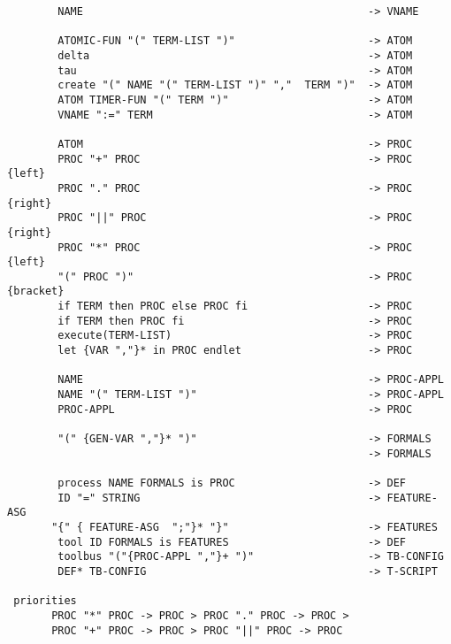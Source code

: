 \begin{verbatim}
        NAME                                             -> VNAME

        ATOMIC-FUN "(" TERM-LIST ")"                     -> ATOM
        delta                                            -> ATOM
        tau                                              -> ATOM
        create "(" NAME "(" TERM-LIST ")" ","  TERM ")"  -> ATOM
        ATOM TIMER-FUN "(" TERM ")"                      -> ATOM
        VNAME ":=" TERM                                  -> ATOM

        ATOM                                             -> PROC
        PROC "+" PROC                                    -> PROC  {left}
        PROC "." PROC                                    -> PROC  {right}
        PROC "||" PROC                                   -> PROC  {right}
        PROC "*" PROC                                    -> PROC  {left}
        "(" PROC ")"                                     -> PROC  {bracket}
        if TERM then PROC else PROC fi                   -> PROC
        if TERM then PROC fi                             -> PROC
        execute(TERM-LIST)                               -> PROC
        let {VAR ","}* in PROC endlet                    -> PROC

        NAME                                             -> PROC-APPL
        NAME "(" TERM-LIST ")"                           -> PROC-APPL
        PROC-APPL                                        -> PROC

        "(" {GEN-VAR ","}* ")"                           -> FORMALS
                                                         -> FORMALS

        process NAME FORMALS is PROC                     -> DEF
        ID "=" STRING                                    -> FEATURE-ASG
       "{" { FEATURE-ASG  ";"}* "}"                      -> FEATURES
        tool ID FORMALS is FEATURES                      -> DEF
        toolbus "("{PROC-APPL ","}+ ")"                  -> TB-CONFIG
        DEF* TB-CONFIG                                   -> T-SCRIPT

 priorities
       PROC "*" PROC -> PROC > PROC "." PROC -> PROC >
       PROC "+" PROC -> PROC > PROC "||" PROC -> PROC

\end{verbatim}
\normalsize

